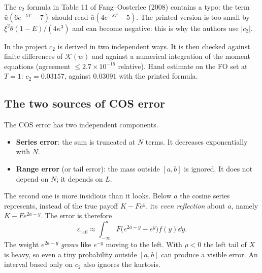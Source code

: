 \begin{attenzione}[title={A misprint in the literature}]
The $c_2$ formula in Table 11 of Fang--Oosterlee (2008) contains a typo: the term $\bar u(6e^{-\lambda T}-7)$ should
read $\bar u(4e^{-\lambda T}-5)$. The printed version is too small by $\xi^2\theta(1-E)/(4\kappa^3)$ and can become
negative: this is why the authors use $|c_2|$.

In the project $c_2$ is derived in two independent ways. It is then checked against finite differences of
$\mathcal K(w)$ and against a numerical integration of the moment equations (agreement $\le{2.7\times10^{-15}}$
relative). Hand estimate on the FO set at $T=1$: $c_2=0.03157$, against $0.03091$ with the printed formula.
\end{attenzione}

\subsection{The two sources of COS error}
The COS error has two independent components.
\begin{itemize}
\item \textbf{Series error}: the sum is truncated at $N$ terms. It decreases exponentially with $N$.
\item \textbf{Range error} (or tail error): the mass outside $[a,b]$ is ignored. It does not depend on $N$; it depends
on $L$.
\end{itemize}
The second one is more insidious than it looks. Below $a$ the cosine series represents, instead of the true payoff
$K-Fe^y$, its \emph{even reflection} about $a$, namely $K-Fe^{2a-y}$. The error is therefore
\begin{equation}\label{eq:cos-riflessione}
\varepsilon_{\text{tail}}\approx\int_{-\infty}^aF\big(e^{2a-y}-e^{y}\big)f(y)\dd y .
\end{equation}
The weight $e^{2a-y}$ \emph{grows} like $e^{-y}$ moving to the left. With $\rho<0$ the left tail of $X$ is heavy, so
even a tiny probability outside $[a,b]$ can produce a visible error. An interval based only on $c_2$ also ignores the
kurtosis.

